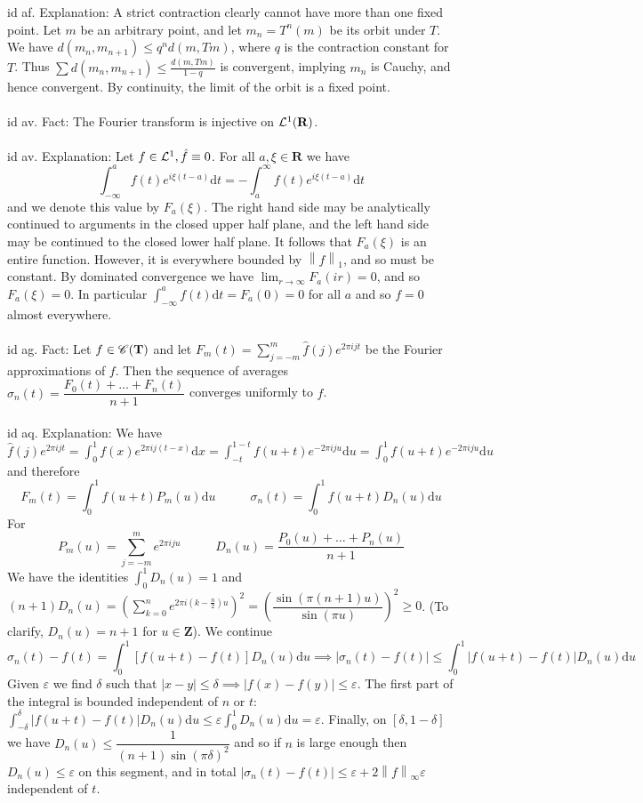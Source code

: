 \documentclass[oneside]{book}
\newcommand{\eps}{\varepsilon}
\newcommand{\Z}{\mathbf{Z}}
\newcommand{\R}{\mathbf{R}}
\newcommand{\T}{\mathbf{T}}
\newcommand{\fit}[1]{\left( #1\right)}
\newcommand{\abs}[1]{\left\lvert #1\right\rvert}
\newcommand{\norm}[1]{\left\lVert #1\right\rVert}
\renewcommand{\d}{\mathrm{d}}
\begin{document}
id af. Explanation: A strict contraction clearly cannot have more than one fixed point. Let $m$ be an arbitrary point, and let $m_n=T^n(m)$ be its orbit under $T$. We have $d(m_n,m_{n+1})\le q^{n}d(m,Tm)$, where $q$ is the contraction constant for $T$. Thus $\sum d(m_n,m_{n+1}) \le \frac{d(m,Tm)}{1-q}$ is convergent, implying $m_n$ is Cauchy, and hence convergent. By continuity, the limit of the orbit is a fixed point.  \\\\


id av. Fact: The Fourier transform is injective on $\LL^1(\R)$.     \\\\


id av. Explanation: Let $f\in\mathcal{L}^1, \hat{f}\equiv 0$. For all $a,\xi\in\R$ we have
$$\int_{-\infty}^a f(t)e^{i\xi(t-a)}\d t=-\int_a^\infty f(t)e^{i\xi(t-a)}\d t$$
and we denote this value by $F_a(\xi)$. The right hand side may be analytically continued to arguments in the closed upper half plane, and the left hand side may be continued to the closed lower half plane. It follows that $F_a(\xi)$ is an entire function. However, it is everywhere bounded by $\norm{f}_1$, and so must be constant. By dominated convergence we have $\lim_{r\to\infty} F_a(ir)=0$, and so $F_a(\xi)=0$. In particular $\int_{-\infty}^a f(t)\d t=F_a(0)=0$ for all $a$ and so $f=0$ almost everywhere.    \\\\


id ag. Fact: Let $f\in\CC(\T)$ and let $F_m(t)=\displaystyle\sum_{j=-m}^m \hat{f}(j) e^{2\pi i jt}$ be the Fourier approximations of $f$. Then the sequence of averages $\sigma_n(t)=\dfrac{F_0(t)+\dots +F_n(t)}{n+1}$ converges uniformly to $f$. \\\\


id aq. Explanation: We have
$\hat{f}(j)e^{2\pi ijt}=\int_0^1 f(x)e^{2\pi i j(t-x)}\d x=\int_{-t}^{1-t}f(u+t)e^{-2\pi i j u}\d u=\int_{0}^{1}f(u+t)e^{-2\pi i j u}\d u$
and therefore 
$$F_m(t)=\int_0^1 f(u+t) P_m(u)\d u \phantom{---} \sigma_n(t)=\int_0^1 f(u+t) D_n(u)\d u $$
For
$$P_m(u)=\sum_{j=-m}^m e^{2\pi i j u} \phantom{---} D_n(u)=\dfrac{P_0(u)+\dots+P_n(u)}{n+1}$$
We have the identities $\displaystyle \int_0^1 D_n(u)=1$ and
$\displaystyle (n+1)D_n(u)=\fit{\sum_{k=0}^n e^{2\pi i(k-\frac{n}{2})u}}^2=\fit{\dfrac{\sin(\pi(n+1)u)}{\sin(\pi u)}}^2\ge0$. (To clarify, $D_n(u)=n+1$ for $u\in\Z$).
We continue
$$\sigma_n(t)-f(t)=\int_0^1  [f(u+t)-f(t)] D_n(u)\d u\implies \abs{\sigma_n(t)-f(t)}\le\int_0^1  \abs{f(u+t)-f(t)} D_n(u)\d u $$
Given $\eps$ we find $\delta$ such that
$\abs{x-y}\le\delta\implies\abs{f(x)-f(y)}\le\eps$.
The first part of the integral is bounded independent of $n$ or $t$: $ \int_{-\delta}^{\delta}  \abs{f(u+t)-f(t)} D_n(u)\d u\le \eps  \int_{0}^{1} D_n(u)\d u=\eps$. Finally, on $[\delta,1-\delta]$ we have $D_n(u)\le \dfrac{1}{(n+1)\sin(\pi\delta)^2}$
and so if $n$ is large enough then $D_n(u)\le \eps$ on this segment, and in total 
$\abs{\sigma_n(t)-f(t)}\le \eps+2\norm{f}_\infty\eps$
independent of $t$.     \\\\
\end{document}

